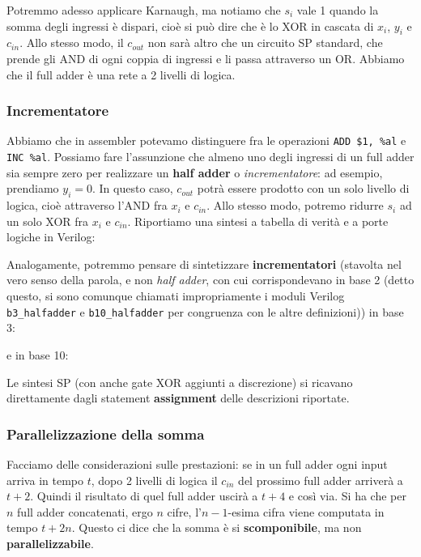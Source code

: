 \documentclass[a4paper,11pt]{article}
\begin{document}
Potremmo adesso applicare Karnaugh, ma notiamo che $s_i$ vale 1 quando la somma degli ingressi è dispari, cioè si può dire che è lo XOR in cascata di $x_i$, $y_i$ e $c_{in}$. 
Allo stesso modo, il $c_{out}$ non sarà altro che un circuito SP standard, che prende gli AND di ogni coppia di ingressi e li passa attraverso un OR.
Abbiamo che il full adder è una rete a 2 livelli di logica.

\subsubsection{Incrementatore}
Abbiamo che in assembler potevamo distinguere fra le operazioni \lstinline|ADD $1, %al| e \lstinline|INC %al|.
Possiamo fare l'assunzione che almeno uno degli ingressi di un full adder sia sempre zero per realizzare un \textbf{half adder} o \textit{incrementatore}: ad esempio, prendiamo $y_i = 0$. 
In questo caso, $c_{out}$ potrà essere prodotto con un solo livello di logica, cioè attraverso l'AND fra $x_i$ e $c_{in}$.
Allo stesso modo, potremo ridurre $s_i$ ad un solo XOR fra $x_i$ e $c_{in}$.
Riportiamo una sintesi a tabella di verità e a porte logiche in Verilog:



Analogamente, potremmo pensare di sintetizzare \textbf{incrementatori} (stavolta nel vero senso della parola, e non \textit{half adder}, con cui corrispondevano in base 2 (detto questo, si sono comunque chiamati impropriamente i moduli Verilog \lstinline|b3_halfadder| e \lstinline|b10_halfadder| per congruenza con le altre definizioni)) in base 3: 



e in base 10: 



Le sintesi SP (con anche gate XOR aggiunti a discrezione) si ricavano direttamente dagli statement \textbf{assignment} delle descrizioni riportate.

\subsubsection{Parallelizzazione della somma}
Facciamo delle considerazioni sulle prestazioni: se in un full adder ogni input arriva in tempo $t$, dopo 2 livelli di logica il $c_{in}$ del prossimo full adder arriverà a $t + 2$.
Quindi il risultato di quel full adder uscirà a $t + 4$ e così via.
Si ha che per $n$ full adder concatenati, ergo $n$ cifre, l'$n-1$-esima cifra viene computata in tempo $t + 2n$.
Questo ci dice che la somma è si \textbf{scomponibile}, ma non \textbf{parallelizzabile}.
\end{document}
